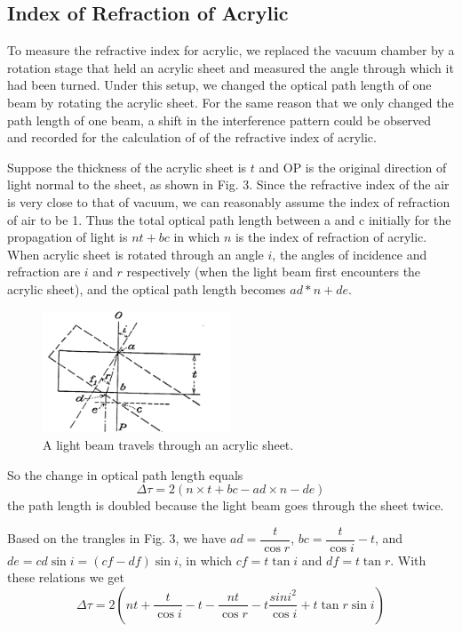 \documentclass{article}
\begin{document}
\subsection{Index of Refraction of Acrylic}
To measure the refractive index for acrylic, we replaced the vacuum chamber by a rotation stage that held an acrylic sheet and measured the angle through which it had been turned. Under this setup, we changed the optical path length of one beam by rotating the acrylic sheet. For the same reason that we only changed the path length of one beam, a shift in the interference pattern could be observed and recorded for the calculation of of the refractive index of acrylic. 

Suppose the thickness of the acrylic sheet is $t$ and OP is the original direction of light normal to the sheet, as shown in Fig. 3. Since the refractive index of the air is very close to that of vacuum, we can reasonably assume the index of refraction of air to be 1. Thus the total optical path length between a and c initially for the propagation of light is $nt+bc$ in which $n$ is the index of refraction of acrylic. When acrylic sheet is rotated through an angle $i$, the angles of incidence and refraction are $i$ and $r$ respectively (when the light beam first encounters the acrylic sheet), and the optical path length becomes $ad*n+de$.

\begin{figure}[htb]
	\begin{center}
		\includegraphics[width=0.5\textwidth]{picture4} %
		\caption{A light beam travels through an acrylic sheet.}
	\end{center}
\end{figure}

So the change in optical path length equals
\begin{equation}
	\Delta{\tau}=2(n\times{t}+bc-ad\times{n}-de)
\end{equation}
the path length is doubled because the light beam goes through the sheet twice.

Based on the trangles in Fig. 3, we have $ ad=\dfrac{t}{\cos{r}} $, $ bc= \dfrac{t}{\cos{i}}-t$, and $ de=cd\sin{i}=(cf-df)\sin{i}$, in which $cf=t\tan{i}$ and $df=t\tan{r}$. With these relations we get
\begin{equation}
	\Delta{\tau}=2(n{t}+\dfrac{t}{\cos{i}}-t-\dfrac{nt}{\cos{r}}-t\dfrac{sin{i}^{2}}{\cos{i}}+t\tan{r}\sin{i})
\end{equation}
\end{document}
